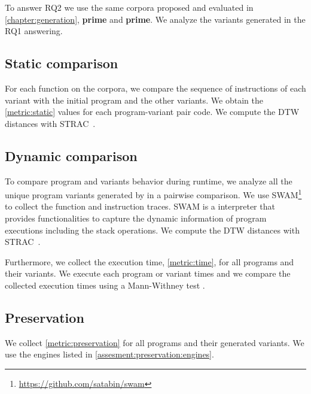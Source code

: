 To answer RQ2 we use the same corpora proposed and evaluated in \autoref{chapter:generation}, \textbf{prime} and \textbf{prime}. We analyze the variants generated in the RQ1 answering. 

\subsection{Static comparison}
For each function on the corpora, we compare the sequence of instructions of each variant with the initial program and the other variants. We obtain the \autoref{metric:static} values for each program-variant \wasm pair code. We compute the DTW distances with STRAC~\cite{Cabrera19}. 

\subsection{Dynamic comparison}
To compare program and variants behavior during runtime, we analyze all the unique program variants generated by \tool in a pairwise comparison. 
We use SWAM\footnote{\url{https://github.com/satabin/swam}} to collect the function and instruction traces. SWAM is a \wasm interpreter that provides functionalities to capture the dynamic information of \wasm program executions including the stack operations. We compute the DTW distances with STRAC~\cite{Cabrera19}. 

Furthermore, we collect the execution time, \autoref{metric:time}, for all programs and their variants. We execute each program or variant  times and we compare the collected execution times using a Mann-Withney test \citationneeded.

\subsection{Preservation}

We collect \autoref{metric:preservation} for all programs and their generated variants. We use the engines listed in \autoref{assesment:preservation:engines}.


